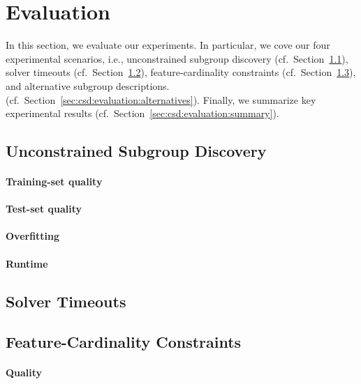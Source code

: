 \documentclass{article}
\theoremstyle{definition}
\begin{document}
\section{Evaluation}
\label{sec:csd:evaluation}

In this section, we evaluate our experiments.
In particular, we cove our four experimental scenarios, i.e., unconstrained subgroup discovery (cf.~Section~\ref{sec:csd:evaluation:unconstrained}), solver timeouts (cf.~Section~\ref{sec:csd:evaluation:timeouts}), feature-cardinality constraints (cf.~Section~\ref{sec:csd:evaluation:cardinality}), and alternative subgroup descriptions. (cf.~Section~\ref{sec:csd:evaluation:alternatives}).
Finally, we summarize key experimental results (cf.~Section~\ref{sec:csd:evaluation:summary}).

\subsection{Unconstrained Subgroup Discovery}
\label{sec:csd:evaluation:unconstrained}

\paragraph{Training-set quality}

\paragraph{Test-set quality}

\paragraph{Overfitting}

\paragraph{Runtime}

\subsection{Solver Timeouts}
\label{sec:csd:evaluation:timeouts}

\subsection{Feature-Cardinality Constraints}
\label{sec:csd:evaluation:cardinality}

\paragraph{Quality}
\end{document}
